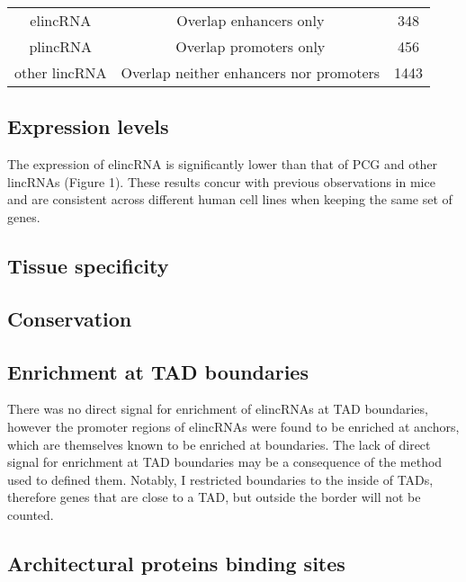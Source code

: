 \documentclass[10pt,a4paper]{report}
\begin{document}
\begin{table}
\begin{tabular}{c c c}
elincRNA & Overlap enhancers only & 348\\
plincRNA & Overlap promoters only & 456\\
other lincRNA & Overlap neither enhancers nor promoters & 1443\\

\end{tabular}
\end{table}

\subsection*{Expression levels}

The expression of elincRNA is significantly lower than that of PCG and other lincRNAs (Figure 1). These results concur with previous observations in mice  \cite{Marques2013}⁠ and are consistent across different human cell lines when keeping the same set of genes.





\subsection*{Tissue specificity}



\subsection*{Conservation}

\subsection*{Enrichment at TAD boundaries}

There was no direct signal for enrichment of elincRNAs at TAD boundaries, however the promoter regions of elincRNAs were found to be enriched at anchors, which are themselves known to be enriched at boundaries. The lack of direct signal for enrichment at TAD boundaries may be a consequence of the method used to defined them. Notably, I restricted boundaries to the inside of TADs, therefore genes that are close to a TAD, but outside the border will not be counted. 


\subsection*{Architectural proteins binding sites}
\end{document}
